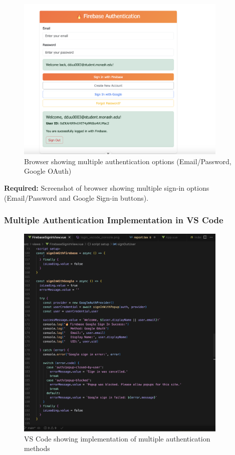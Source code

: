 \documentclass[11pt,a4paper]{article}
\begin{document}
\begin{figure}[H]
     \centering
     \includegraphics[width=0.9\textwidth]{multiple_signin_browser.png}
     \caption{Browser showing multiple authentication options (Email/Password, Google OAuth)}
     \label{fig:multiple_signin_browser}
 \end{figure}

\textbf{Required:} Screenshot of browser showing multiple sign-in options (Email/Password and Google Sign-in buttons).

\subsubsection{Multiple Authentication Implementation in VS Code}

 \begin{figure}[H]
     \centering
     \includegraphics[width=0.9\textwidth]{multiple_signin_vscode.png}
     \caption{VS Code showing implementation of multiple authentication methods}
     \label{fig:multiple_signin_vscode}
 \end{figure}
\end{document}
